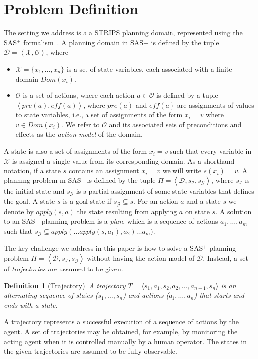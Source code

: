 \documentclass{article}
\newtheorem{definition}{Definition}
\newcommand{\tuple}[1]{\ensuremath{\left \langle #1 \right \rangle }}
\newcommand{\SAS}{SAS$^+$}
\newcommand{\eff}{\textit{eff}}
\newcommand{\pre}{\textit{pre}}
\newcommand{\roni}[1]{[[Roni:#1]]}
\begin{document}
	\section{Problem Definition}\label{problemdef-sec}
	The setting we address is a a STRIPS planning domain, represented 
	using the \SAS{} formalism~\cite{backstrom1995complexity}. 
	A planning domain in SAS$+$ is defined by the tuple $\mathcal{D}=\tuple{\mathcal{X}, \mathcal{O}}$, where 
	\begin{itemize}
		\item $\mathcal{X}=\{x_1,\ldots, x_n\}$ is a set of state variables, each associated with a finite domain $Dom(x_i)$. 
		\item $\mathcal{O}$ is a set of actions, where each action $a\in \mathcal{O}$      is defined by a tuple $\tuple{\pre(a), \eff(a)}$, where $\pre(a)$ and $\eff(a)$ are assignments of values to state variables, i.e., a set of assignments of the form $x_i=v$ where $v\in Dom(x_i)$. We refer to $\mathcal{O}$ and its associated sets of preconditions and effects as the {\em action model} of the domain.
	\end{itemize}
	
	A state is also a set of assignments of the form $x_i=v$ 
	such that every variable in $\mathcal{X}$ is assigned a single value from its corresponding domain. As a shorthand notation, if a state $s$ contains an assignment $x_i=v$ we will write $s(x_i)=v$. A planning problem in \SAS{} is defined by the tuple $\Pi=\tuple{\mathcal{D},s_\mathcal{I}, s_\mathcal{G}}$, where 
	$s_\mathcal{I}$ is the initial state and $s_\mathcal{G}$ 
	is a partial assignment of some state variables that defines the goal. A state $s$ is a goal state if $s_\mathcal{G}\subseteq s$. 
	For an action $a$ and a state $s$ we denote by $apply(s,a)$ the state
	resulting from applying $a$ on state $s$. 
	A solution to an \SAS{} planning problem is a {\em plan}, 
	which is a sequence of actions $a_1,\ldots,a_m$ such that  $s_\mathcal{G}\subseteq apply(\ldots apply(s,a_1), a_2)\ldots a_m)$. 
	
	The key challenge we address in this paper is how to solve a \SAS{} 
	planning problem $\Pi=\tuple{\mathcal{D},s_\mathcal{I}, s_\mathcal{G}}$ without having the action model of $\mathcal{D}$. Instead, a set of {\em trajectories} are assumed to be given. 
	\begin{definition}[Trajectory]
		A trajectory $T=\langle s_1, a_1, s_2, a_2, \ldots, a_{n-1}, s_n\rangle$ is an alternating sequence of states ($s_1,\ldots,s_n$) and actions ($a_1,\ldots,a_n$) that starts and ends with a state. 
	\end{definition}
	A trajectory represents a successful execution of a sequence of actions by the agent. A set of trajectories may be obtained, for example, by monitoring the acting agent when it is controlled manually by a human operator. The states in the given trajectories are assumed to be fully observable. 
	
\end{document}
